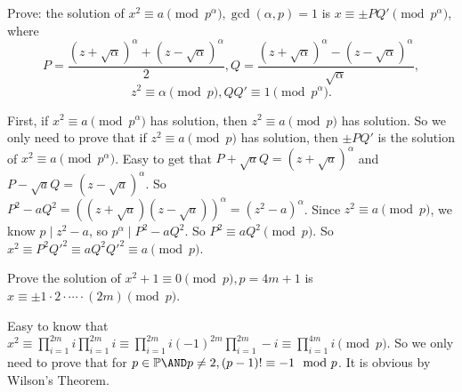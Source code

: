 \documentclass{ctexart}
\begin{document}
\begin{problem}\label{pro:5}
  Prove: the solution of \(x^2 \equiv a\pmod{p^\alpha},\gcd(\alpha,p)=1\) is \(x \equiv \pm PQ'\pmod{p^\alpha}\), where \[
    P=\frac{(z + \sqrt{\alpha})^\alpha + (z - \sqrt{\alpha})^\alpha}{2}, Q=\frac{(z + \sqrt{\alpha})^\alpha - (z-\sqrt{\alpha})^\alpha}{\sqrt{\alpha}},
  \]
  \[
    z^2\equiv \alpha\pmod{p}, QQ' \equiv 1 \pmod{p^\alpha}.
  \]
\end{problem}
\begin{solution}
  First, if \(x^2 \equiv a \pmod{p^\alpha}\) has solution, then \(z^2 \equiv a \pmod{p}\) has solution.
  So we only need to prove that if \(z^2 \equiv a \pmod{p}\) has solution, then \(\pm PQ'\) is the
  solution of \(x^2 \equiv a \pmod{p^\alpha}\). Easy to get that \(P + \sqrt{a}Q=(z + \sqrt{a})^\alpha\)
  and \(P-\sqrt{a}Q=(z-\sqrt{a})^\alpha\). So \(P^2-aQ^2=((z + \sqrt{a})(z-\sqrt{a}))^\alpha=(z^2-a)^\alpha\).
  Since \(z^2 \equiv a \pmod{p}\), we know \(p \mid z^2-a\), so \(p^\alpha \mid P^2-aQ^2\).
  So \(P^2 \equiv aQ^2 \pmod{p}\). So \(x^2 \equiv P^2Q'^2 \equiv aQ^2Q'^2 \equiv a \pmod{p}\).
\end{solution}
\begin{problem}\label{pro:6}
  Prove the solution of \(x^2 + 1 \equiv 0 \pmod{p},p=4m + 1\) is \(x \equiv \pm 1 \cdot 2 \cdot \cdots \cdot (2m)\pmod{p}\).
\end{problem}
\begin{solution}
  Easy to know that \(x^2 \equiv \prod_{i=1}^{2m} i \prod_{i=1}^{2m} i \equiv \prod_{i=1}^{2m} i(-1)^{2m} \prod_{i=1}^{2m} -i \equiv \prod_{i=1}^{4m} i \pmod{p}\).
  So we only need to prove that for \(p \in \mathbb{P} \AND p \neq 2, (p-1)!\equiv -1 \mod p\).
  It is obvious by Wilson's Theorem.
\end{solution}
\end{document}
